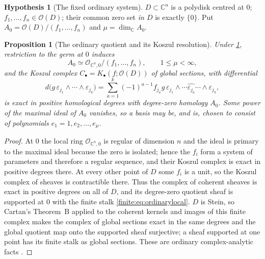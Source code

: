 \documentclass[11pt,letterpaper]{article}
\newtheorem{proposition}[theorem]{Proposition}
\theoremstyle{definition}
\newtheorem{hypothesis}[theorem]{Hypothesis}
\theoremstyle{remark}
\newcommand{\C}{\mathbb C}
\newcommand{\OO}{\mathcal O}
\numberwithin{equation}{section}
\begin{document}
\begin{hypothesis}[The fixed ordinary system]
\label{finite:hyp:ordinary}
$D\subset\C^n$ is a polydisk centred at $0$; $f_1,\ldots,f_n\in\OO(D)$; their common zero set \emph{in $D$} is exactly $\{0\}$. Put $A_0=\OO(D)/(f_1,\ldots,f_n)$ and $\mu=\dim_\C A_0$.
\end{hypothesis}

\begin{proposition}[The ordinary quotient and its Koszul resolution]
\label{finite:prop:ordinarykoszul}
Under \cref{finite:hyp:ordinary}, restriction to the germ at $0$ induces
\begin{equation}\label{finite:eq:ordinarylocal}
 A_0\simeq\OO_{\C^n,0}/(f_1,\ldots,f_n),
 \qquad 1\leq\mu<\infty,
\end{equation}
and the Koszul complex $C_\bullet=K_\bullet(f;\OO(D))$ of \emph{global} sections, with differential
\begin{equation}\label{finite:eq:koszul}
 d\bigl(g\,\varepsilon_{j_1}\wedge\cdots\wedge\varepsilon_{j_k}\bigr)
 =\sum_{a=1}^{k}(-1)^{a-1}f_{j_a}g\,
 \varepsilon_{j_1}\wedge\cdots\widehat{\varepsilon_{j_a}}\cdots\wedge\varepsilon_{j_k},
\end{equation}
is exact in positive homological degrees with degree-zero homology $A_0$. Some power of the maximal ideal of $A_0$ vanishes, so a basis may be, and is, chosen to consist of polynomials $e_1=1,e_2,\ldots,e_\mu$.
\end{proposition}

\begin{proof}
At $0$ the local ring $\OO_{\C^n,0}$ is regular of dimension $n$ and the ideal is primary to the maximal ideal because the zero is isolated; hence the $f_i$ form a system of parameters and therefore a regular sequence, and their Koszul complex is exact in positive degrees there. At every other point of $D$ some $f_i$ is a unit, so the Koszul complex of sheaves is contractible there. Thus the complex of coherent sheaves is exact in positive degrees on all of $D$, and its degree-zero quotient sheaf is supported at $0$ with the finite stalk \eqref{finite:eq:ordinarylocal}. $D$ is Stein, so Cartan's Theorem~B applied to the coherent kernels and images of this finite complex makes the complex of global sections exact in the same degrees and the global quotient map onto the supported sheaf surjective; a sheaf supported at one point has its finite stalk as global sections. These are ordinary complex-analytic facts \cite{finite:Cartan,finite:GunningRossi,finite:Demailly}.
\end{proof}
\end{document}
